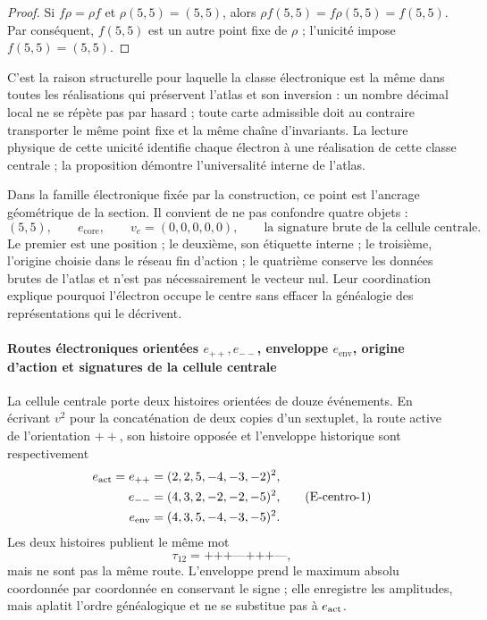 \begin{proof}
Si \(f\rho=\rho f\) et \(\rho(5,5)=(5,5)\), alors
\(\rho f(5,5)=f\rho(5,5)=f(5,5)\). Par conséquent, \(f(5,5)\) est un autre point fixe
de \(\rho\) ; l'unicité impose \(f(5,5)=(5,5)\).
\end{proof}

C'est la raison structurelle pour laquelle la classe électronique est la même dans
toutes les réalisations qui préservent l'atlas et son inversion : un nombre décimal local ne se répète pas
par hasard ; toute carte admissible doit au contraire
transporter le même point fixe et la même chaîne d'invariants. La lecture
physique de cette unicité identifie chaque électron à une réalisation de cette
classe centrale ; la proposition démontre l'universalité interne de l'atlas.

Dans la famille électronique fixée par la construction, ce point est l'ancrage
géométrique de la section. Il convient de ne pas confondre quatre objets :
\[
 (5,5),\qquad
 e_{\mathrm{core}},\qquad
 v_e=(0,0,0,0,0),\qquad
 \text{la signature brute de la cellule centrale}.
\]
Le premier est une position ; le deuxième, son étiquette interne ; le troisième,
l'origine choisie dans le réseau fin d'action ; le quatrième conserve les
données brutes de l'atlas et n'est pas nécessairement le vecteur nul. Leur
coordination explique pourquoi l'électron occupe le centre sans effacer la
généalogie des représentations qui le décrivent.

\paragraph{Routes électroniques orientées \(e_{++},e_{--}\), enveloppe \(e_{\mathrm{env}}\), origine d'action et signatures de la cellule centrale}
La cellule centrale porte deux histoires orientées de douze événements. En écrivant
\(v^2\) pour la concaténation de deux copies d'un sextuplet, la route active
de l'orientation \({++}\), son histoire opposée et l'enveloppe historique
sont respectivement
\[
\begin{aligned}
 e_{\rm act}=e_{++}
   &=(2,2,5,-4,-3,-2)^2,\\
 e_{--}
   &=(4,3,2,-2,-2,-5)^2,\\
 e_{\rm env}
   &=(4,3,5,-4,-3,-5)^2.
\end{aligned}
\tag{E-centro-1}\label{p12-83-c15-s2:eq:electron-rutas-finas-rev8}
\]
Les deux histoires publient le même mot
\[
 \tau_{12}=\texttt{+++---+++---},
\]
mais ne sont pas la même route. L'enveloppe prend le maximum absolu
coordonnée par coordonnée en conservant le signe ; elle enregistre les amplitudes, mais
aplatit l'ordre généalogique et ne se substitue pas à \(e_{\rm act}\).

